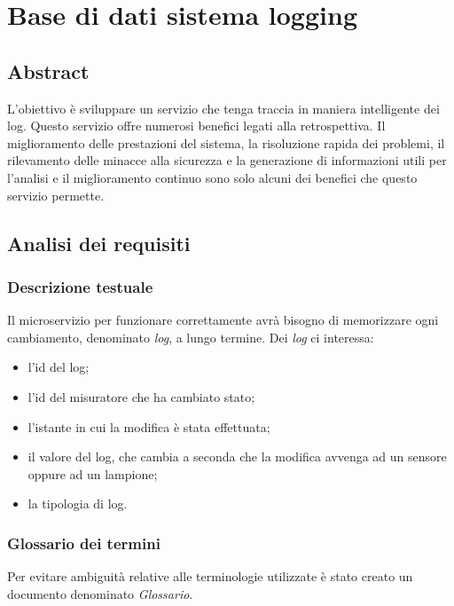 \section{Base di dati sistema logging}\label{sec:sbd-sistema-logging}

\subsection{Abstract}

L’obiettivo è sviluppare un servizio che tenga traccia in maniera intelligente dei log. Questo servizio offre numerosi benefici legati alla retrospettiva. Il miglioramento delle prestazioni del sistema, la risoluzione rapida dei problemi, il rilevamento delle minacce alla sicurezza e la generazione di informazioni utili per l'analisi e il miglioramento continuo sono solo alcuni dei benefici che questo servizio permette.

\subsection{Analisi dei requisiti}

\subsubsection{Descrizione testuale}

Il microservizio per funzionare correttamente avrà bisogno di memorizzare ogni cambiamento, denominato {\it{log}}, a lungo termine. Dei {\it{log}} ci interessa:

\begin{itemize}
    \item l'id del log;
    \item l'id del misuratore che ha cambiato stato;
    \item l'istante in cui la modifica è  stata effettuata;
    \item il valore del log, che cambia a seconda che la modifica avvenga ad un sensore oppure ad un lampione;
    \item la tipologia di log.
\end{itemize}

\subsubsection{Glossario dei termini}

Per evitare ambiguità relative alle terminologie utilizzate è stato creato un documento denominato \textit{Glossario}.

